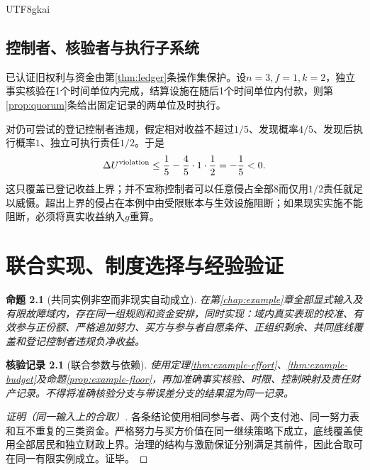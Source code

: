 \documentclass[12pt,a4paper,openany]{report}
\newtheorem{proposition}{命题}[chapter]
\newtheorem{Certificate}{核验记录}[chapter]
\begin{document}
\begin{CJK*}{UTF8}{gkai}
\section{控制者、核验者与执行子系统}
已认证旧权利与资金由第\ref{thm:ledger}条操作集保护。设$n=3,f=1,k=2$，独立事实核验在1个时间单位内完成，结算设施在随后1个时间单位内付款，则第\ref{prop:quorum}条给出固定记录的两单位及时执行。

对仍可尝试的登记控制者违规，假定相对收益不超过$1/5$、发现概率$4/5$、发现后执行概率$1$、独立可执行责任$1/2$。于是
\[
 \Delta U^{\rm violation}\le\frac15-\frac45\cdot1\cdot\frac12=-\frac15<0.
\]
这只覆盖已登记收益上界；并不宣称控制者可以任意侵占全部$8$而仅用$1/2$责任就足以威慑。超出上界的侵占在本例中由受限账本与生效设施阻断；如果现实实施不能阻断，必须将真实收益纳入$g$重算。



\chapter{联合实现、制度选择与经验验证}
\label{chap:implementation}
\begin{proposition}[共同实例非空而非现实自动成立]
\label{prop:example-joint}
在第\ref{chap:example}章全部显式输入及有限故障域内，存在同一组规则和资金安排，同时实现：域内真实表现的校准、有效参与正份额、严格追加努力、买方与参与者自愿条件、正组织剩余、共同底线覆盖和登记控制者违规负净收益。
\end{proposition}
\begin{Certificate}[联合参数与依赖]
使用定理\ref{thm:example-effort}、\ref{thm:example-budget}及命题\ref{prop:example-floor}，再加准确事实核验、时限、控制映射及责任财产记录。不得将准确核验分支与带误差分支的结果混为同一记录。
\end{Certificate}
\begin{proof}[证明（同一输入上的合取）]
各条结论使用相同参与者、两个支付池、同一努力表和互不重复的三类资金。严格努力与买方价值在同一继续策略下成立，底线覆盖使用全部居民和独立财政上界。治理的结构与激励保证分别满足其前件，因此合取可在同一有限实例成立。证毕。
\end{proof}


\end{CJK*}
\end{document}
